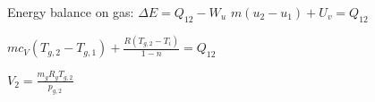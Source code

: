 Energy balance on gas:  
\( \Delta E = Q_{12} - W_u \)  
\( m(u_2 - u_1) + U_v = Q_{12} \)  

\( m c_V (T_{g,2} - T_{g,1}) + \frac{R(T_{g,2} - T_i)}{1 - n} = Q_{12} \)  

\( V_2 = \frac{m_g R_g T_{g,2}}{p_{g,2}} \)